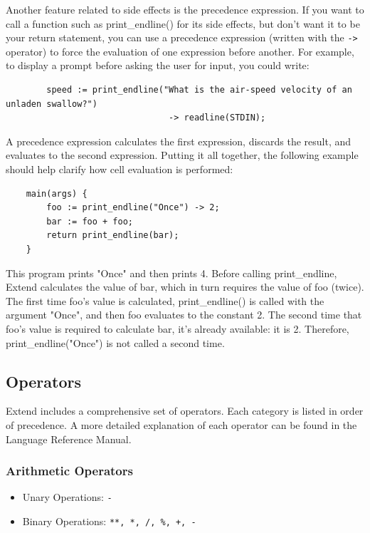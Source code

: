 	Another feature related to side effects is the precedence expression. If you want to call a function such as print\_endline() for its side effects, but don't want it to be your return statement, you can use a precedence expression (written with the \texttt{->} operator) to force the evaluation of one expression before another. For example, to display a prompt before asking the user for input, you could write:
	\begin{lstlisting}
	 	speed := print_endline("What is the air-speed velocity of an unladen swallow?")
								-> readline(STDIN);
	\end{lstlisting}
	A precedence expression calculates the first expression, discards the result, and evaluates to the second expression. Putting it all together, the following example should help clarify how cell evaluation is performed:

	\begin{lstlisting}
	main(args) {
		foo := print_endline("Once") -> 2;
		bar := foo + foo;
		return print_endline(bar);
	}
	\end{lstlisting}

	\medskip \noindent
	This program prints "Once" and then prints 4. Before calling print\_endline, Extend calculates the value of bar, which in turn requires the value of foo (twice). The first time foo's value is calculated, print\_endline() is called with the argument "Once", and then foo evaluates to the constant 2. The second time that foo's value is required to calculate bar, it's already available: it is 2. Therefore, print\_endline("Once") is not called a second time.

	\subsection{Operators}
	Extend includes a comprehensive set of operators. Each category is listed in order of precedence. A more detailed explanation of each operator can be found in the Language Reference Manual.

		\subsubsection{Arithmetic Operators}
			\begin{itemize}
				\item Unary Operations: \texttt{-}
				\item Binary Operations: \texttt{**, *, /, \%, +, -}
			\end{itemize}

